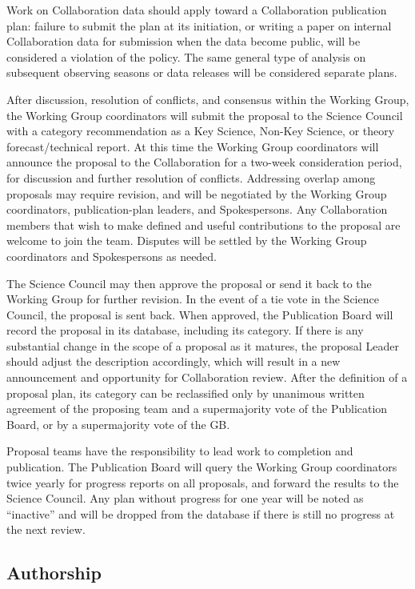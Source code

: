 \documentclass[12pt]{article}
\begin{document}
Work on Collaboration data should apply toward a Collaboration publication plan: failure to submit the plan at its initiation, or writing a paper on internal Collaboration data for submission when the data become public, will be considered a violation of the policy.  The same general type of analysis on subsequent observing seasons or data releases will be considered separate plans.

After discussion, resolution of conflicts, and consensus within the Working Group, the Working Group coordinators will submit the proposal to the Science Council with a category recommendation as a Key Science, Non-Key Science, or theory forecast/technical report.  At this time the Working Group coordinators will announce the proposal to the Collaboration for a two-week consideration period, for discussion and further resolution of conflicts. Addressing overlap among proposals may require revision, and will be negotiated by the Working Group coordinators, publication-plan leaders, and Spokespersons.  Any Collaboration members that wish to make defined and useful contributions to the proposal are welcome to join the team.  Disputes will be settled by the Working Group coordinators and Spokespersons as needed.

The Science Council may then approve the proposal or send it back to the Working Group for further revision. In the event of a tie vote in the Science Council, the proposal is sent back. When approved, the Publication Board will record the proposal in its database, including its category. If there is any substantial change in the scope of a proposal as it matures, the proposal Leader should adjust the description accordingly, which will result in a new announcement and opportunity for Collaboration review.  After the definition of a proposal plan, its category can be reclassified only by unanimous written agreement of the proposing team and a supermajority vote of the Publication Board, or by a supermajority vote of the GB.

Proposal teams have the responsibility to lead work to completion and publication. The Publication Board will query the Working Group coordinators twice yearly for progress reports on all proposals, and forward the results to the Science Council. Any plan without progress for one year will be noted as ``inactive'' and will be dropped from the database if there is still no progress at the next review.

\subsection{Authorship}
\end{document}
